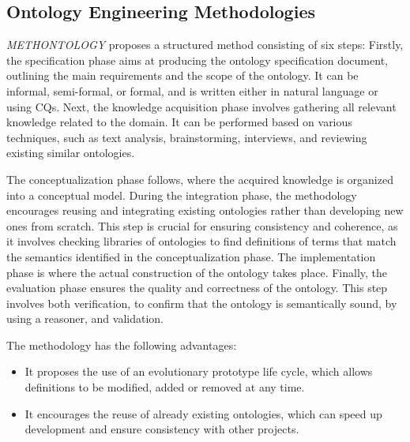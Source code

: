 \subsection{Ontology Engineering Methodologies}
\textit{METHONTOLOGY} \cite{fernandez1997ontological} proposes a structured method consisting of six steps:  
Firstly, the specification phase aims at producing the ontology specification document, outlining the main requirements and the scope of the ontology.
It can be informal, semi-formal, or formal, and is written either in natural language or using CQs.
Next, the \textsf{knowledge acquisition} phase involves gathering all relevant knowledge related to the domain. 
It can be performed based on various techniques, such as text analysis, brainstorming, interviews, and reviewing existing similar ontologies.

The \textsf{conceptualization} phase follows, where the acquired knowledge is organized into a conceptual model.
During the \textsf{integration} phase, the methodology encourages reusing and integrating existing ontologies rather than developing new ones from scratch. 
This step is crucial for ensuring consistency and coherence, as it involves checking libraries of ontologies to find definitions of terms that match the semantics identified in the conceptualization phase.
The \textsf{implementation} phase is where the actual construction of the ontology takes place.
Finally, the \textsf{evaluation} phase ensures the quality and correctness of the ontology.
This step involves both verification, to confirm that the ontology is semantically sound, by using a reasoner, and validation.

The methodology has the following advantages: 
\begin{itemize}
    \item It proposes the use of an evolutionary prototype life cycle, which allows definitions to be modified, added or removed at any time.

    \item It encourages the reuse of already existing ontologies, which can speed up development and ensure consistency with other projects. 
\end{itemize}

